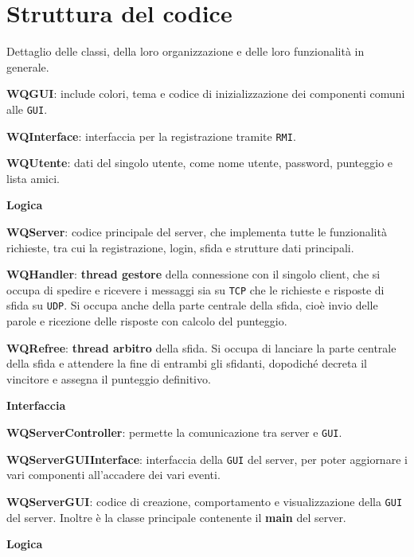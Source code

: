 \documentclass[10pt]{article}
\begin{document}
{\section{Struttura del codice}
Dettaglio delle classi, della loro organizzazione e delle loro funzionalità in generale.
\begin{list}{}{Classi comuni ai due componenti}
	\item \textbf{WQGUI}: include colori, tema e codice di inizializzazione dei componenti comuni alle \texttt{GUI}.
	\item \textbf{WQInterface}: interfaccia per la registrazione tramite \texttt{RMI}.
	\item \textbf{WQUtente}: dati del singolo utente, come nome utente, password, punteggio e lista amici.
\end{list}
\begin{list}{}{\textbf{Server}}
	\item \textbf{Logica}
	\item \textbf{WQServer}: codice principale del server, che implementa tutte le funzionalità richieste, tra cui la registrazione, login, sfida e strutture dati principali.
	\item \textbf{WQHandler}: \textbf{thread gestore} della connessione con il singolo client, che si occupa di spedire e ricevere i messaggi sia su \texttt{TCP} che le richieste e risposte di sfida su \texttt{UDP}. Si occupa anche della parte centrale della sfida, cioè invio delle parole e ricezione delle risposte con calcolo del punteggio.
	\item \textbf{WQRefree}: \textbf{thread arbitro} della sfida. Si occupa di lanciare la parte centrale della sfida e attendere la fine di entrambi gli sfidanti, dopodiché decreta il vincitore e assegna il punteggio definitivo.
	\item \textbf{Interfaccia}
	\item \textbf{WQServerController}: permette la comunicazione tra server e \texttt{GUI}.
	\item \textbf{WQServerGUIInterface}: interfaccia della \texttt{GUI} del server, per poter aggiornare i vari componenti all'accadere dei vari eventi.
	\item \textbf{WQServerGUI}: codice di creazione, comportamento e visualizzazione della \texttt{GUI} del server. Inoltre è la classe principale contenente il \textbf{main} del server.
\end{list}
\begin{list}{}{\textbf{Client}}
	\item \textbf{Logica}

\end{list}}
\end{document}
